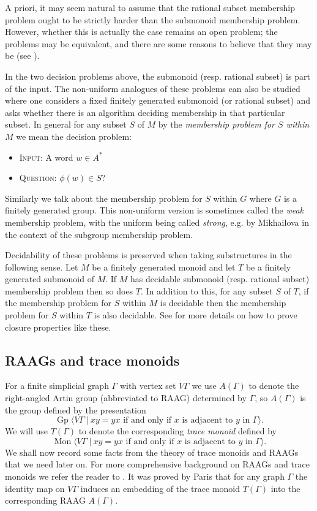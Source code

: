 \documentclass{amsart}
\newcommand{\Mpres}[2]{\operatorname{Mon}\bigl\langle #1\:|\:#2 \bigr\rangle}
\newcommand{\Gpres}[2]{\operatorname{Gp}\bigl\langle #1\:|\:#2 \bigr\rangle}
\theoremstyle{plain}
\theoremstyle{definition}
\begin{document}
A priori, it may seem natural to assume that the rational subset membership problem ought to be strictly harder than the submonoid membership problem. However, whether this is actually the case remains an open problem; the problems may be equivalent, and there are some reasons to believe that they may be (see \cite{Lohrey2008}). 

In the two decision problems above, the submonoid (resp. rational subset) is part of the input. 
The non-uniform analogues of these problems can also be studied where one considers a fixed finitely generated submonoid (or rational subset) and asks whether there is an algorithm deciding membership in that particular subset. 
In general for any subset $S$ of $M$ by the 
\emph{membership problem for $S$ within $M$} we mean the decision problem:
\begin{itemize} 
\item{\textsc{Input}:} 
A word $w \in A^*$   
\item{\textsc{Question}:} $\phi(w) \in S$? 
  \end{itemize}
Similarly we talk about the membership problem for $S$ within $G$ where $G$ is a finitely generated group. This non-uniform version is sometimes called the \textit{weak} membership problem, with the uniform being called \textit{strong}, e.g. by Mikhailova \cite{Mikhailova1958} in the context of the subgroup membership problem.

Decidability of these problems is preserved when taking substructures in the following sense. 
Let $M$ be a finitely generated monoid and let $T$ be a finitely generated submonoid of $M$. 
If $M$ has decidable submonoid (resp. rational subset) membership problem then so does $T$. 
In addition to this, for any subset $S$ of $T$, if 
the membership problem for $S$ within $M$ is decidable then      
the membership problem for $S$ within $T$ is also decidable.
See \cite[\S5]{Lohrey2015} for more details on how to prove closure properties like these.    

\subsection*{RAAGs and trace monoids}

For a finite simplicial graph $\Gamma$ 
with vertex set $V\Gamma$  
we use $A(\Gamma)$ to denote the right-angled Artin group (abbreviated to RAAG) determined by $\Gamma$, so $A(\Gamma)$ is the group defined by the presentation 
\[
\Gpres{V\Gamma}{xy=yx \mbox{ \ if and only if $x$ is adjacent to $y$ in $\Gamma$} }.   
\]
We will use $T(\Gamma)$ to denote the corresponding \emph{trace monoid} defined by  
\[
\Mpres{V\Gamma}{xy=yx \mbox{ \ if and only if $x$ is adjacent to $y$ in $\Gamma$} }.   
\]
We shall now record some facts from the theory of trace monoids and RAAGs that we need later on. For more comprehensive background on RAAGs and trace monoids we refer the reader to \cite{Charney2007, Diekert1990}. It was proved by Paris \cite{Paris2002} that for any graph $\Gamma$ the identity map on $V\Gamma$ induces an embedding of the trace monoid $T(\Gamma)$ into the corresponding RAAG $A(\Gamma)$.  
\end{document}
